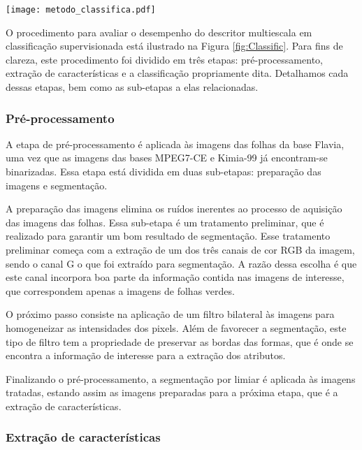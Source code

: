 \begin{figure*}[b]
\caption{\label{fig:Classific}
Metodologia de classificação para avaliação de desempenho do descritor otimizado pelo método proposto exibido na Figura.  \ref{fig:Avaliacao}} 
\centering
\texttt{[image: metodo\_classifica.pdf]}
\end{figure*}

O procedimento para avaliar o desempenho do descritor multiescala em classificação supervisionada está ilustrado na Figura \ref{fig:Classific}. Para fins de clareza, este procedimento foi dividido em três etapas: pré-processamento, extração de características e a classificação propriamente dita. Detalhamos cada dessas etapas, bem como as sub-etapas a elas relacionadas.

\subsubsection*{Pré-processamento}

A etapa de pré-processamento é aplicada às imagens das folhas da base Flavia, uma vez que as imagens das bases MPEG7-CE e Kimia-99 já encontram-se binarizadas. Essa etapa está dividida em duas sub-etapas: preparação das imagens e segmentação. 

A preparação das imagens elimina os ruídos inerentes ao processo de aquisição das imagens das folhas. Essa sub-etapa é um tratamento preliminar, que é realizado para garantir um bom resultado de segmentação. Esse tratamento preliminar começa com a extração de um dos três canais de cor RGB da imagem, sendo o canal G o que foi extraído para segmentação. A razão dessa escolha é que este canal incorpora boa parte da informação contida nas imagens de interesse, que correspondem apenas a imagens de folhas verdes. 

O próximo passo consiste na aplicação de um filtro bilateral \cite{Gonzalez:2006} às imagens para homogeneizar as intensidades dos pixels.  Além de favorecer a segmentação, este tipo de filtro tem a propriedade de preservar as bordas das formas, que é onde se encontra a informação de interesse para a extração dos atributos. 

Finalizando o pré-processamento, a segmentação por limiar \cite{Gonzalez:2006} é aplicada às imagens tratadas, estando assim as imagens preparadas para a próxima etapa, que é a extração de características.

\subsubsection*{Extração de características}

